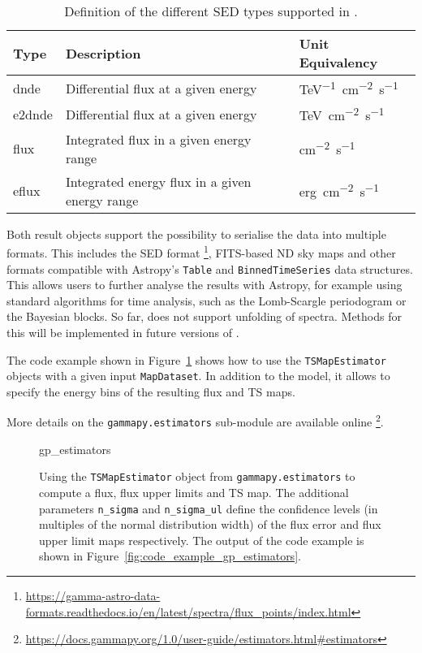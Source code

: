 \documentclass[longauth]{aa}
\newcommand{\code}[1]{\texttt{#1}}
\begin{document}
\begin{table*}
    \begin{center}
        \begin{tabular}{lll}
         \hline
         Type & Description & Unit Equivalency \\
         \hline
         dnde & Differential flux at a given energy & \si{TeV^{-1}.cm^{-2}.s^{-1}} \\
         e2dnde & Differential flux at a given energy  & \si{TeV.cm^{-2}.s^{-1}} \\
         flux & Integrated flux in a given energy range & \si{cm^{-2}.s^{-1}} \\
         eflux & Integrated energy flux in a given energy range & \si{erg.cm^{-2}.s^{-1}}\\
         \hline
        \end{tabular}
    \end{center}
    \caption{Definition of the different SED types supported in \gammapy.}
    \label{tab:sed_types}
\end{table*}


Both result objects support the possibility to serialise
the data into multiple formats. This includes the
\gadf SED format \footnote{\url{https://gamma-astro-data-formats.readthedocs.io/en/latest/spectra/flux_points/index.html}},
FITS-based ND sky maps and other formats compatible with Astropy's \code{Table} and
\code{BinnedTimeSeries} data structures. This allows
users to further analyse the results with Astropy, for example using
standard algorithms for time analysis, such as
the Lomb-Scargle periodogram or the Bayesian
blocks. So far, \gammapy does not support unfolding of \gammaray spectra.
Methods for this will be implemented in future versions of \gammapy.

The code example shown in Figure~\ref{fig*:minted:gp_estimators} shows how to use
the \code{TSMapEstimator} objects with a given input \code{MapDataset}.
In addition to the model, it allows to specify the energy
bins of the resulting flux and TS maps.

More details on the \code{gammapy.estimators} sub-module are available online \footnote{\url{https://docs.gammapy.org/1.0/user-guide/estimators.html\#estimators}}.

\begin{figure}
	\small
	{gp_estimators}
	\caption{Using the \code{TSMapEstimator} object from \code{gammapy.estimators} to compute a
	 flux, flux upper limits and TS map. The additional parameters \code{n\_sigma}
        and \code{n\_sigma\_ul} define the confidence levels (in multiples of the normal distribution width)
        of the flux error and flux upper limit maps respectively. The output
		of the code example is shown in Figure~\ref{fig:code_example_gp_estimators}.
    }
    \label{fig*:minted:gp_estimators}
\end{figure}
\end{document}
